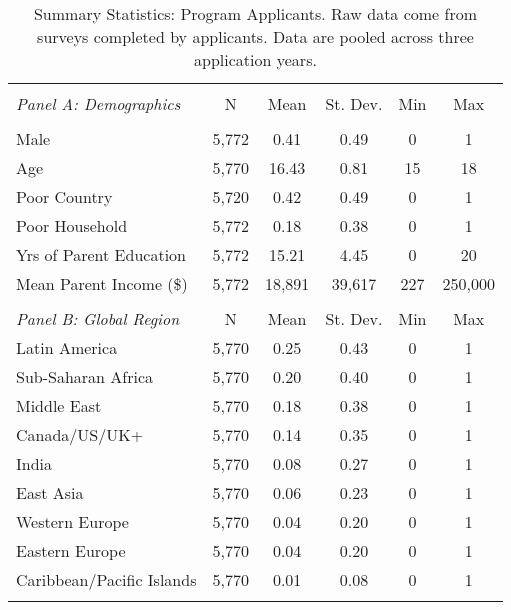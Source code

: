 \begin{table}[htbp] 
    \centering 
    \caption{Summary Statistics:  Program Applicants. Raw data come from surveys completed by applicants. Data are pooled across three application years.}
    \label{tab:pooled_demo}
    \begin{tabular}{@{\extracolsep{5pt}}lccccc} 
    \\[-1.8ex]\hline 
    \hline \\[-1.8ex] 
    \emph{Panel A: Demographics} & \multicolumn{1}{c}{N} & \multicolumn{1}{c}{Mean} & \multicolumn{1}{c}{St. Dev.} & \multicolumn{1}{c}{Min} & \multicolumn{1}{c}{Max} \\ 
    \hline \\[-1.8ex] 
    Male & 5,772 & 0.41 & 0.49 & 0 & 1 \\ 
    Age & 5,770 & 16.43 & 0.81 & 15 & 18 \\ 
    Poor Country & 5,720 & 0.42 & 0.49 & 0 & 1 \\ 
    Poor Household & 5,772 & 0.18 & 0.38 & 0 & 1 \\ 
    Yrs of Parent Education & 5,772 & 15.21 & 4.45 & 0 & 20 \\ 
    Mean Parent Income (\$) & 5,772 & 18,891 & 39,617 & 227 & 250,000 \\ 
    \hline
    & & & & & \\
    \emph{Panel B: Global Region} & \multicolumn{1}{c}{N} & \multicolumn{1}{c}{Mean} & \multicolumn{1}{c}{St. Dev.} & \multicolumn{1}{c}{Min} & \multicolumn{1}{c}{Max} \\ 
    \hline
    Latin America & 5,770 & 0.25 & 0.43 & 0 & 1 \\ 
    Sub-Saharan Africa & 5,770 & 0.20 & 0.40 & 0 & 1 \\ 
    Middle East & 5,770 & 0.18 & 0.38 & 0 & 1 \\ 
    Canada/US/UK+ & 5,770 & 0.14 & 0.35 & 0 & 1 \\ 
    India & 5,770 & 0.08 & 0.27 & 0 & 1 \\ 
    East Asia & 5,770 & 0.06 & 0.23 & 0 & 1 \\ 
    Western Europe & 5,770 & 0.04 & 0.20 & 0 & 1 \\ 
    Eastern Europe & 5,770 & 0.04 & 0.20 & 0 & 1 \\ 
    Caribbean/Pacific Islands & 5,770 & 0.01 & 0.08 & 0 & 1 \\ 
    \hline \hline \\[-1.8ex] 
    \end{tabular} 
    \end{table} 
    
